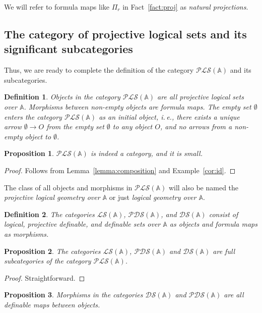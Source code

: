 \documentclass[12pt]{article}
\newtheorem{proposition}{Proposition}
\newtheorem{definition}{Definition}
\theoremstyle{definition}
\def\MA{{\mathbb{A}}}
\def\PLS{{\mathcal{PLS}}}
\def\PDS{{\mathcal{PDS}}}
\def\DS{{\mathcal{DS}}}
\def\LS{{\mathcal{LS}}}
\begin{document}
We will refer to formula maps like $\Pi_r$ in Fact~\ref{fact:proj} as {\em natural projections}.

\subsection{The category of projective logical sets and its significant subcategories}\label{subsec:cat}

Thus, we are ready to complete the definition of the category $\PLS(\MA)$ and its subcategories. 

\begin{definition}
Objects in the category $\PLS(\MA)$ are all projective logical sets over $\MA$. Morphisms between non-empty objects are formula maps. The empty set $\emptyset$ enters the category $\PLS(\MA)$ as an initial object, i.\,e., there exists a unique arrow $\emptyset \to O$ from the empty set $\emptyset$ to any object $O$, and no arrows from a non-empty object to $\emptyset$.   
\end{definition}

\begin{proposition}
$\PLS(\MA)$ is indeed a category, and it is small.
\end{proposition}

\begin{proof}
Follows from  Lemma~\ref{lemma:composition} and Example~\ref{cor:id}.
\end{proof}

The class of all objects and morphisms in $\PLS(\MA)$ will also be named the {\em projective logical geometry over $\MA$} or just {\em logical geometry over $\MA$}.

\begin{definition}
The categories $\LS(\MA)$, $\PDS(\MA)$, and $\DS(\MA)$  consist of logical, projective definable, and definable sets over $\MA$ as objects and formula maps as morphisms.    
\end{definition}

\begin{proposition}
 The categories $\LS(\MA)$, $\PDS(\MA)$ and $\DS(\MA)$ are full subcategories of the category $\PLS(\MA)$.
\end{proposition}

\begin{proof}
    Straightforward.
\end{proof}

\begin{proposition}
  Morphisms in the categories $\DS(\MA)$ and $\PDS(\MA)$ are all definable maps between objects.  
\end{proposition}
\end{document}
